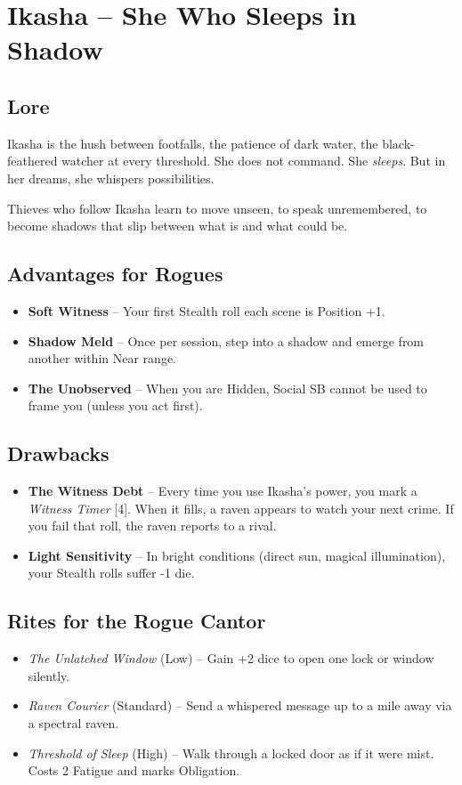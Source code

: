 \documentclass[10pt,twoside]{book}
\begin{document}
\chapter{Ikasha -- She Who Sleeps in Shadow}

\section{Lore}
Ikasha is the hush between footfalls, the patience of dark water, the black-feathered watcher at every threshold. She does not command. She \emph{sleeps}. But in her dreams, she whispers possibilities.

Thieves who follow Ikasha learn to move unseen, to speak unremembered, to become shadows that slip between what is and what could be.

\section{Advantages for Rogues}
\begin{itemize}
\item \textbf{Soft Witness} -- Your first Stealth roll each scene is Position +1.
\item \textbf{Shadow Meld} -- Once per session, step into a shadow and emerge from another within Near range.
\item \textbf{The Unobserved} -- When you are Hidden, Social SB cannot be used to frame you (unless you act first).
\end{itemize}

\section{Drawbacks}
\begin{itemize}
\item \textbf{The Witness Debt} -- Every time you use Ikasha's power, you mark a \textit{Witness Timer } [4]. When it fills, a raven appears to watch your next crime. If you fail that roll, the raven reports to a rival.
\item \textbf{Light Sensitivity} -- In bright conditions (direct sun, magical illumination), your Stealth rolls suffer -1 die.
\end{itemize}

\section{Rites for the Rogue Cantor}
\begin{itemize}
\item \textit{The Unlatched Window} (Low) -- Gain +2 dice to open one lock or window silently.
\item \textit{Raven Courier} (Standard) -- Send a whispered message up to a mile away via a spectral raven.
\item \textit{Threshold of Sleep} (High) -- Walk through a locked door as if it were mist. Costs 2 Fatigue and marks Obligation.
\end{itemize}
\end{document}
